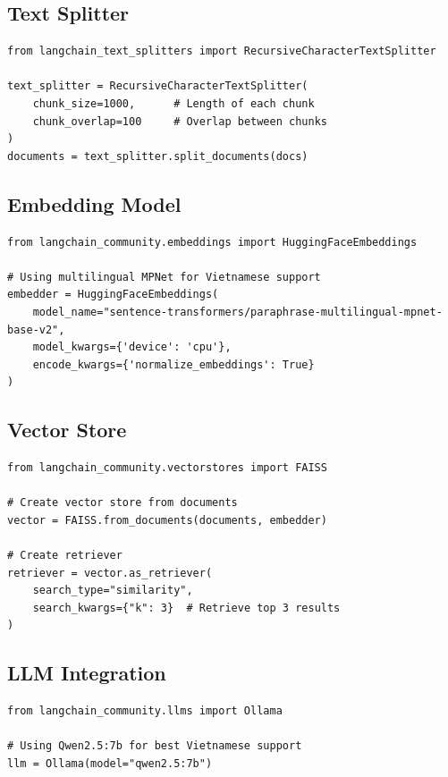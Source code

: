 \documentclass[12pt,a4paper]{report}
\begin{document}
\subsection{Text Splitter}
\begin{lstlisting}
from langchain_text_splitters import RecursiveCharacterTextSplitter

text_splitter = RecursiveCharacterTextSplitter(
    chunk_size=1000,      # Length of each chunk
    chunk_overlap=100     # Overlap between chunks
)
documents = text_splitter.split_documents(docs)
\end{lstlisting}

\subsection{Embedding Model}
\begin{lstlisting}
from langchain_community.embeddings import HuggingFaceEmbeddings

# Using multilingual MPNet for Vietnamese support
embedder = HuggingFaceEmbeddings(
    model_name="sentence-transformers/paraphrase-multilingual-mpnet-base-v2",
    model_kwargs={'device': 'cpu'},
    encode_kwargs={'normalize_embeddings': True}
)
\end{lstlisting}

\subsection{Vector Store}
\begin{lstlisting}
from langchain_community.vectorstores import FAISS

# Create vector store from documents
vector = FAISS.from_documents(documents, embedder)

# Create retriever
retriever = vector.as_retriever(
    search_type="similarity",
    search_kwargs={"k": 3}  # Retrieve top 3 results
)
\end{lstlisting}

\subsection{LLM Integration}
\begin{lstlisting}
from langchain_community.llms import Ollama

# Using Qwen2.5:7b for best Vietnamese support
llm = Ollama(model="qwen2.5:7b")
\end{lstlisting}
\end{document}
